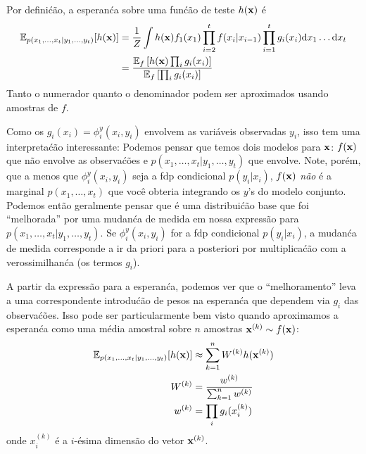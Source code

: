 \begin{exenumerate}
    \begin{solution}
        
        Por defini\'c\~ao, a esperan\'ca sobre uma fun\'c\~ao de teste $h(\mathbf{x})$ \'e
        \begin{align}
            \mathbb{E}_{p(x_1, \ldots, x_t | y_1,
                \ldots, y_t)}[ h(\mathbf{x}) ] & = \frac{1}{Z} \int h(\mathbf{x}) f_1(x_1) \prod_{i=2}^t f(x_i|x_{i-1})\prod_{i=1}^t g_i(x_i) \mathrm{d} x_1 \ldots \mathrm{d} x_t\\
            & = \frac{\mathbb{E}_f \left[ h(\mathbf{x}) \prod_i g_i(x_i) \right]}{\mathbb{E}_f\left [\prod_i g_i(x_i) \right]}
        \end{align}
        Tanto o numerador quanto o denominador podem ser aproximados usando
        amostras de $f$.
        
        Como os $g_i(x_i) = \phi_i^y(x_i,y_i)$ envolvem as vari\'aveis observadas
        $y_i$, isso tem uma interpreta\'c\~ao interessante: Podemos pensar que
        temos dois modelos para $\mathbf{x}$: $f(\mathbf{x})$ que n\~ao envolve as
        observa\'c\~oes e $p(x_1, \ldots, x_t | y_1,\ldots, y_t)$ que
        envolve. Note, por\'em, que a menos que $\phi_i^y(x_i, y_i)$ seja a
        fdp condicional $p(y_i|x_i)$, $f(\mathbf{x})$ \emph{n\~ao} \'e a marginal
        $p(x_1, \ldots, x_t)$ que voc\^e obteria integrando os
        $y$'s do modelo conjunto. Podemos ent\~ao geralmente pensar que \'e uma
        distribui\'c\~ao base que foi ``melhorada'' por uma mudan\'ca de medida em nossa express\~ao para
        $p(x_1, \ldots, x_t| y_1,\ldots, y_t)$. Se $\phi_i^y(x_i, y_i)$ for
        a fdp condicional $p(y_i|x_i)$, a mudan\'ca de medida
        corresponde a ir da priori para a posteriori por
        multiplica\'c\~ao com a verossimilhan\'ca (os termos $g_i$).
        
        A partir da express\~ao para a esperan\'ca, podemos ver que o
        ``melhoramento'' leva a uma correspondente introdu\'c\~ao de pesos na
        esperan\'ca que dependem via $g_i$ das observa\'c\~oes. Isso
        pode ser particularmente bem visto quando aproximamos a esperan\'ca como
        uma m\'edia amostral sobre $n$ amostras $\mathbf{x}^{(k)} \sim f(\mathbf{x})$:
        \begin{align}
            \mathbb{E}_{p(x_1, \ldots, x_t | y_1, \ldots, y_t)}[ h(\mathbf{x}) ] & \approx \sum_{k=1}^n W^{(k)} h(\mathbf{x}^{(k)})\\
            W^{(k)} & =  \frac{w^{(k)}}{\sum_{k=1}^n  w^{(k)}}\\
            w^{(k)} & =  \prod_i g_i(x^{(k)}_i)
        \end{align}
        onde $x^{(k)}_i$ \'e a $i$-\'esima dimens\~ao do vetor $\mathbf{x}^{(k)}$.
    \end{solution}
    
\end{exenumerate}